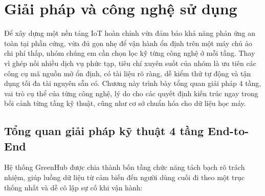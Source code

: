 \chapter{Giải pháp và công nghệ sử dụng}
\label{chap:solution-tech}

Để xây dựng một nền tảng IoT hoàn chỉnh vừa đảm bảo khả năng phản ứng an toàn tại phần cứng, vừa đủ gọn nhẹ để vận hành ổn định trên một máy chủ ảo chi phí thấp, nhóm chúng em cần chọn lọc kỹ từng công nghệ ở mỗi tầng. Thay vì ghép nối nhiều dịch vụ phức tạp, tiêu chí xuyên suốt của nhóm là ưu tiên các công cụ mã nguồn mở ổn định, có tài liệu rõ ràng, dễ kiểm thử tự động và tận dụng tối đa tài nguyên sẵn có. Chương này trình bày tổng quan giải pháp 4 tầng, vai trò cụ thể của từng công nghệ, lý do cho các quyết định kiến trúc ngay trong bối cảnh từng tầng kỹ thuật, cũng như cơ sở chuẩn hóa cho dữ liệu học máy.

\section{Tổng quan giải pháp kỹ thuật 4 tầng End-to-End}
\label{sec:c2-overview}

Hệ thống GreenHub được chia thành bốn tầng chức năng tách bạch rõ trách nhiệm, giúp luồng dữ liệu từ cảm biến đến người dùng cuối đi theo một trục thống nhất và dễ cô lập sự cố khi vận hành:

